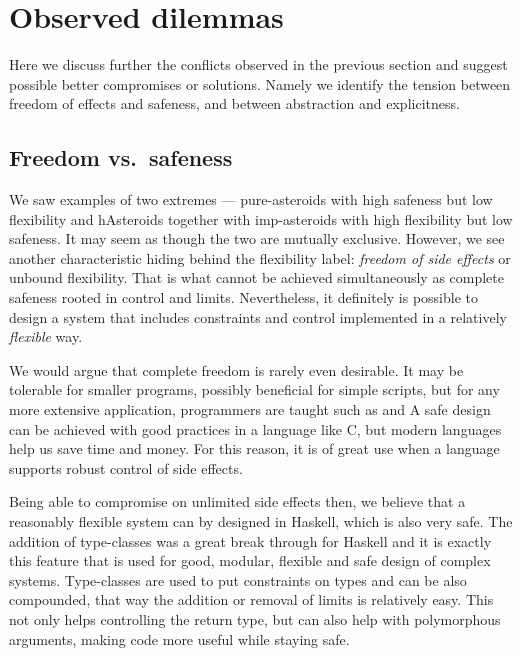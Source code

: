 \documentclass[
  digital, %
  color,   %
  table,   %
  oneside, %
  lof,     %
  lot,     %
]{fithesis3}
\newcommand{\vs}{vs.\ }
\begin{document}
{%






\section{Observed dilemmas}
\label{sect:dilemmas}

Here we discuss further the conflicts observed in the previous section
and suggest possible better compromises or solutions.
Namely we identify the tension between freedom of effects and safeness,
and between abstraction and explicitness.



\subsection{Freedom \vs safeness}
We saw examples of two extremes --- pure-asteroids with high safeness but low flexibility
and hAsteroids together with imp-asteroids with high flexibility but low safeness.
It may seem as though the two are mutually exclusive. However, we see another
characteristic hiding behind the flexibility label: \emph{freedom of side effects}
or unbound flexibility. That is what cannot be achieved
simultaneously as complete safeness rooted in control and limits.
Nevertheless, it definitely is possible to design a system that includes
constraints and control implemented in a relatively \emph{flexible} way.

We would argue that complete freedom is rarely even desirable.
It may be tolerable for smaller programs, possibly beneficial for simple scripts,
but for any more extensive application, programmers are taught  such as
 and 
A safe design can be achieved with good practices in a language like C,
but modern languages help us save time and money.
For this reason, it is of great use when a language supports robust control
of side effects.

Being able to compromise on unlimited side effects then, we believe that a reasonably flexible
system can by designed in Haskell, which is also very safe.
The addition of type-classes was a great break through for Haskell and it is exactly this
feature that is used for good, modular, flexible and safe design of complex systems.
Type-classes are used to put constraints on types and can be also compounded,
that way the addition or removal of limits is relatively easy.
This not only helps controlling the return type, but can also help
with polymorphous arguments, making code more useful while staying safe.

}
\end{document}
